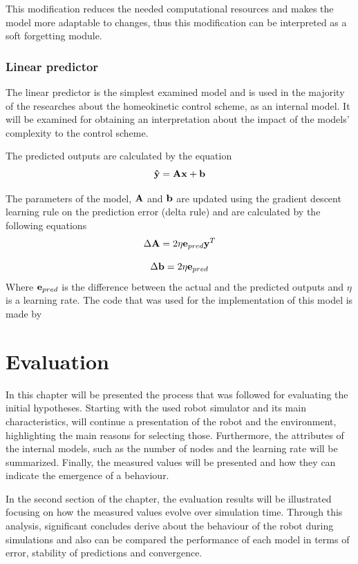 \documentclass[msc,ai,logo]{infthesis}
\begin{document}
This modification reduces the needed computational resources and makes the model more adaptable to changes, thus this modification can be interpreted as a soft forgetting module.    
    
\subsection{Linear predictor}   
The linear predictor is the simplest examined model and is used in the majority of the researches about the homeokinetic control scheme, as an internal model. It will be examined for obtaining an interpretation about the impact of the models' complexity to the control scheme.

The predicted outputs are calculated by the equation 
\begin{equation}
   {\bf{\hat{y}}} = {\bf{Ax}} + {\bf{b}}
   \end{equation}   

The parameters of the model, $\bf{A}$ and $\bf{b}$ are updated using the gradient descent learning rule on the prediction error (delta rule) and are calculated by the following equations
\begin{equation}
\Delta {\bf{A}} = 2\eta {{\bf{e}}_{pred}}{{\bf{y}}^T}
\end{equation}

\begin{equation}
\Delta {\bf{b}} = 2\eta {{\bf{e}}_{pred}}
\end{equation}
Where ${\bf{e}}_{pred}$ is the difference between the actual and the predicted outputs and $ \eta $ is a learning rate. The code that was used  for the implementation of this model is made by \cite{lpzrobots}


\chapter{Evaluation}
In this chapter will be presented the process that was followed for evaluating the initial hypotheses. Starting with the used robot simulator  and its main characteristics, will continue a presentation of the robot and the environment, highlighting the main reasons for selecting those. Furthermore, the attributes of the internal models, such as the number of nodes and the learning rate will be summarized. Finally, the measured values will be presented and how they can indicate the emergence of a behaviour.

In the second section of the chapter, the evaluation results will be illustrated focusing on how the measured values evolve over simulation time. Through this analysis, significant concludes derive about the behaviour of the robot during simulations and also can be compared the performance of each model in terms of error, stability of predictions and convergence.
\end{document}
